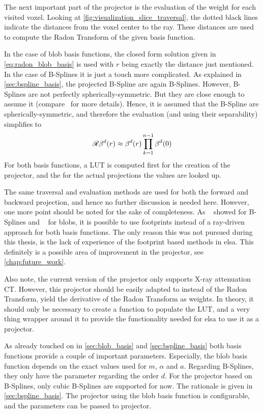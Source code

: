 The next important part of the projector is the evaluation of the weight for each visited voxel.
Looking at \autoref{fig:visualization_slice_traversal}, the dotted black lines indicate the
distances from the voxel center to the ray. These distances are used to compute the Radon Transform
of the given basis function.

In the case of blob basis functions, the closed form solution given in \autoref{eq:radon_blob_basis}
is used with \(r\) being exactly the distance just mentioned. In the case of B-Splines it is just a
touch more complicated. As explained in \autoref{sec:bspline_basis}, the projected B-Spline are
again B-Splines. However, B-Splines are not perfectly spherically-symmetric. But they are close
enough to assume it (compare~\cite{momey_b-spline_2012, momey_spline_2015} for more details). Hence,
it is assumed that the B-Spline are spherically-symmetric, and therefore the evaluation (and using
their separability) simplifies to
\begin{equation}
	\mathscr{R}\beta^d(r) \approx \beta^d(r) \prod^{n - 1}_{k=1} \beta^d(0)
\end{equation}
For both basis functions, a \gls{LUT} is computed first for the creation of the projector, and the
for the actual projections the values are looked up.

The same traversal and evaluation methods are used for both the forward and backward projection, and
hence no further discussion is needed here. However, one more point should be noted for the sake of
completeness. As \citeauthor*{momey_spline_2015}~\cite{momey_spline_2015} showed for B-Splines and
\citeauthor*{kohler_iterative_2011}~\cite{kohler_iterative_2011} for blobs, it is possible to use
footprints instead of a ray-driven approach for both basis functions. The only reason this was not
pursued during this thesis, is the lack of experience of the footprint based methods in elsa. This
definitely is a possible area of improvement in the projector, see \autoref{chap:future_work}.

Also note, the current version of the projector only supports X-ray attenuation CT\@. However, this
projector should be easily adapted to instead of the Radon Transform, yield the derivative of the
Radon Transform as weights. In theory, it should only be necessary to create a function to populate
the \gls{LUT}, and a very thing wrapper around it to provide the functionality needed for elsa to
use it as a projector.

As already touched on in \autoref{sec:blob_basis} and \autoref{sec:bspline_basis} both basis
functions provide a couple of important parameters. Especially, the blob basis function depends on
the exact values used for \(m\), \(\alpha\) and \(a\). Regarding B-Splines, they only have the
parameter regarding the order \(d\). For the projector based on B-Splines, only cubic B-Splines are
supported for now. The rationale is given in \autoref{sec:bspline_basis}. The projector using the
blob basis function is configurable, and the parameters can be passed to projector.


